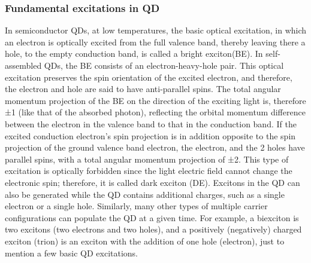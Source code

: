 \subsubsection{Fundamental excitations in QD}
In semiconductor QDs, at low temperatures, the basic optical excitation, in which an electron is optically excited from the full valence band, thereby leaving there a hole, to the empty conduction band, is called a bright exciton(BE). In self-assembled QDs, the BE consists of an electron-heavy-hole pair. This optical excitation preserves the spin orientation of the excited electron, and therefore, the electron and hole are said to have anti-parallel spins. The total angular momentum projection of the BE on the direction of the exciting light is, therefore ±1 (like that of the absorbed photon), reflecting the orbital momentum difference between the electron in the valence band to that in the conduction band.
If the excited conduction electron's spin projection is in addition opposite to the spin projection of the ground valence band electron, the electron, and the 2 holes have parallel spins, with a total angular momentum projection of ±2. This type of excitation is optically forbidden since the light electric field cannot change the electronic spin; therefore, it is called dark exciton (DE). Excitons in the QD can also be generated while the QD contains additional charges, such as a single electron or a single hole. Similarly, many other types of multiple carrier configurations can populate the QD at a given time. For example, a biexciton is two excitons (two electrons and two holes), and a positively (negatively) charged exciton (trion) is an exciton with the addition of one hole (electron), just to mention a few basic QD excitations.
